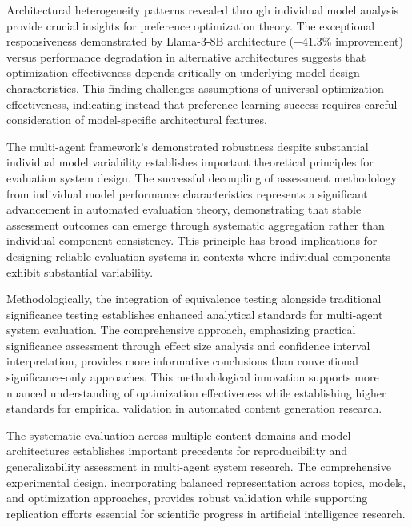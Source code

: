 Architectural heterogeneity patterns revealed through individual model analysis provide crucial insights for preference optimization theory. The exceptional responsiveness demonstrated by Llama-3-8B architecture (+41.3\% improvement) versus performance degradation in alternative architectures suggests that optimization effectiveness depends critically on underlying model design characteristics. This finding challenges assumptions of universal optimization effectiveness, indicating instead that preference learning success requires careful consideration of model-specific architectural features.

The multi-agent framework's demonstrated robustness despite substantial individual model variability establishes important theoretical principles for evaluation system design. The successful decoupling of assessment methodology from individual model performance characteristics represents a significant advancement in automated evaluation theory, demonstrating that stable assessment outcomes can emerge through systematic aggregation rather than individual component consistency. This principle has broad implications for designing reliable evaluation systems in contexts where individual components exhibit substantial variability.

Methodologically, the integration of equivalence testing alongside traditional significance testing establishes enhanced analytical standards for multi-agent system evaluation. The comprehensive approach, emphasizing practical significance assessment through effect size analysis and confidence interval interpretation, provides more informative conclusions than conventional significance-only approaches. This methodological innovation supports more nuanced understanding of optimization effectiveness while establishing higher standards for empirical validation in automated content generation research.

The systematic evaluation across multiple content domains and model architectures establishes important precedents for reproducibility and generalizability assessment in multi-agent system research. The comprehensive experimental design, incorporating balanced representation across topics, models, and optimization approaches, provides robust validation while supporting replication efforts essential for scientific progress in artificial intelligence research.



